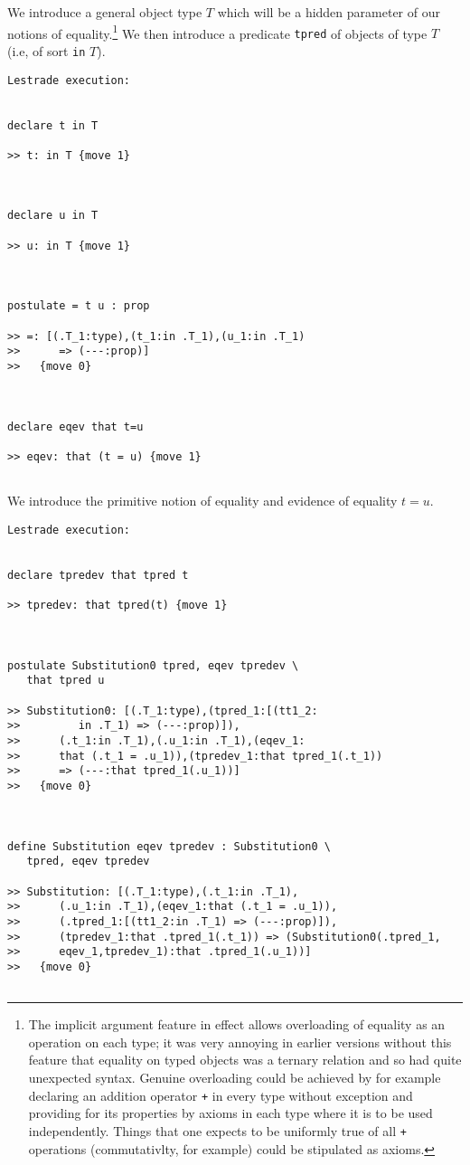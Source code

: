 \documentclass[12pt]{article}
\begin{document}
We introduce a general object type $T$ which will be a hidden parameter of our notions of equality.\footnote{The implicit argument feature in effect allows overloading of equality as an operation on each type;  it was very annoying in earlier versions without this feature that equality on typed objects was a ternary relation and so had quite unexpected syntax.  Genuine overloading could be achieved by for example declaring an addition operator {\tt +} in every type without exception and providing for its properties by axioms in each type where it is to be used independently.  Things that one expects to be uniformly true of all {\tt +} operations (commutativlty, for example) could be stipulated as axioms.}  We then introduce  a predicate {\tt tpred} of objects of type $T$ (i.e, of sort {\tt in} $T$).  

\begin{verbatim}Lestrade execution:


declare t in T

>> t: in T {move 1}



declare u in T

>> u: in T {move 1}



postulate = t u : prop

>> =: [(.T_1:type),(t_1:in .T_1),(u_1:in .T_1)
>>      => (---:prop)]
>>   {move 0}



declare eqev that t=u

>> eqev: that (t = u) {move 1}


\end{verbatim}

We introduce the primitive notion of equality and evidence of equality $t=u$.

\begin{verbatim}Lestrade execution:


declare tpredev that tpred t

>> tpredev: that tpred(t) {move 1}



postulate Substitution0 tpred, eqev tpredev \
   that tpred u

>> Substitution0: [(.T_1:type),(tpred_1:[(tt1_2:
>>         in .T_1) => (---:prop)]),
>>      (.t_1:in .T_1),(.u_1:in .T_1),(eqev_1:
>>      that (.t_1 = .u_1)),(tpredev_1:that tpred_1(.t_1))
>>      => (---:that tpred_1(.u_1))]
>>   {move 0}



define Substitution eqev tpredev : Substitution0 \
   tpred, eqev tpredev

>> Substitution: [(.T_1:type),(.t_1:in .T_1),
>>      (.u_1:in .T_1),(eqev_1:that (.t_1 = .u_1)),
>>      (.tpred_1:[(tt1_2:in .T_1) => (---:prop)]),
>>      (tpredev_1:that .tpred_1(.t_1)) => (Substitution0(.tpred_1,
>>      eqev_1,tpredev_1):that .tpred_1(.u_1))]
>>   {move 0}


\end{verbatim}
\end{document}
